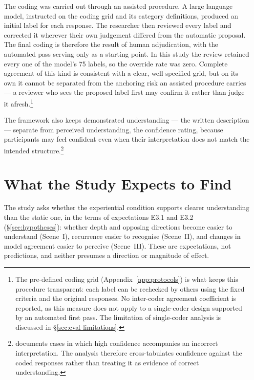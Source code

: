 The coding was carried out through an assisted procedure. A large language model, instructed on the coding grid and its category definitions, produced an initial label for each response. The researcher then reviewed every label and corrected it wherever their own judgement differed from the automatic proposal. The final coding is therefore the result of human adjudication, with the automated pass serving only as a starting point. In this study the review retained every one of the model's 75 labels, so the override rate was zero. Complete agreement of this kind is consistent with a clear, well-specified grid, but on its own it cannot be separated from the anchoring risk an assisted procedure carries --- a reviewer who sees the proposed label first may confirm it rather than judge it afresh.\footnote{The pre-defined coding grid (Appendix~\ref{app:protocols}) is what keeps this procedure transparent: each label can be rechecked by others using the fixed criteria and the original responses. No inter-coder agreement coefficient is reported, as this measure does not apply to a single-coder design supported by an automated first pass. The limitation of single-coder analysis is discussed in \S\ref{sec:eval-limitations}.}

The framework also keeps demonstrated understanding --- the written description --- separate from perceived understanding, the confidence rating, because participants may feel confident even when their interpretation does not match the intended structure.\footnote{\textcite{fischer2020} documents cases in which high confidence accompanies an incorrect interpretation. The analysis therefore cross-tabulates confidence against the coded responses rather than treating it as evidence of correct understanding.}

\section{What the Study Expects to Find}
\label{sec:eval-expectations}

The study asks whether the experiential condition supports clearer understanding than the static one, in the terms of expectations E3.1 and E3.2 (\S\ref{sec:hypotheses}): whether depth and opposing directions become easier to understand (Scene~I), recurrence easier to recognise (Scene~II), and changes in model agreement easier to perceive (Scene~III). These are expectations, not predictions, and neither presumes a direction or magnitude of effect.

